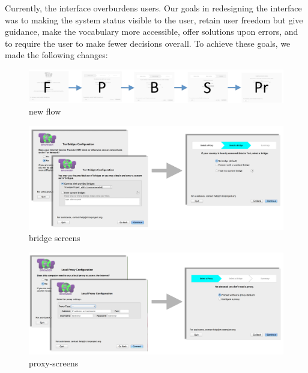 \documentclass[USenglish,oneside,twocolumn]{article}
\begin{document}
Currently, the interface overburdens users. Our goals in redesigning the interface was to making the system status visible to the user, retain user freedom but give guidance, make the vocabulary more accessible, offer solutions upon errors, and to require the user to make fewer decisions overall. To achieve these goals, we made the following changes: \\

\begin{figure}[t]
	\centering
		\includegraphics[width=1.0\textwidth]{new-flow.pdf} 
		\caption{new flow} 
\end{figure} 

\begin{figure}[t]
	\centering
		\includegraphics[width=1.0\textwidth]{bridge-screens.pdf} 
		\caption{bridge screens} 
\end{figure} 

\begin{figure}[t]
	\centering
		\includegraphics[width=1.0\textwidth]{proxy-screens.pdf} 
		\caption{proxy-screens} 
\end{figure} 
\end{document}
